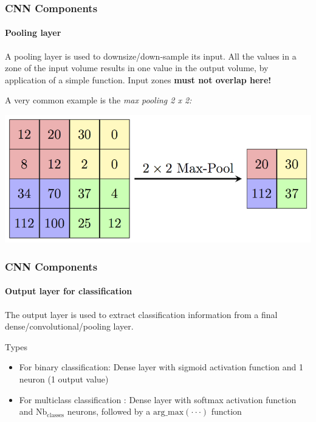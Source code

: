 \documentclass[]{beamer}
\begin{document}
\begin{frame}
  \frametitle{CNN Components}
  \framesubtitle{Pooling layer}
  A \alert{pooling layer} is used to downsize/down-sample its input. \alert{All} the values in a zone of the input volume results in \alert{one} value in the output volume, by application of a simple function. Input zones \bf{must not overlap} here!

  A very common example is the \it{max pooling} 2 x 2:
  \begin{center}
    \includegraphics[width=\linewidth]{resources/pool}
  \end{center}
\end{frame}

\begin{frame}
  \frametitle{CNN Components}
  \framesubtitle{Output layer for classification}
  The output layer is used to extract classification information from a final dense/convolutional/pooling layer.
  \begin{block}{Types}
    \begin{itemize}
      \item For binary classification: Dense layer with \alert{sigmoid} activation function and \alert{1} neuron (1 output value)
      \item For multiclass classification : Dense layer with \alert{softmax} activation function and \alert{$\text{Nb}_{\text{classes}}$} neurons, followed by a $\text{arg\_max}(\cdot\cdot\cdot)$ function
    \end{itemize}
  \end{block}
\end{frame}
\end{document}
